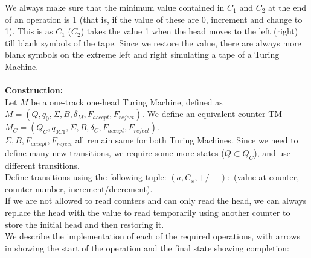 \documentclass[12pt,a4paper]{article}
\begin{document}
We always make sure that the minimum value contained in $C_1$ and $C_2$ at the end of an operation is 1 (that is, if the value of these are 0, increment and change to 1). This is as $C_1$ ($C_2$) takes the value 1 when the head moves to the left (right) till blank symbols of the tape. Since we restore the value, there are always more blank symbols on the extreme left and right simulating a tape of a Turing Machine.
\\
\\\textbf{Construction:}
\\Let $M$ be a one-track one-head Turing Machine, defined as $M = (Q,q_0,\Sigma,B,\delta_M,F_{accept},F_{reject})$. We define an equivalent counter TM $M_C = (Q_C,q_{0C1},\Sigma,B,\delta_C,F_{accept},F_{reject})$. 
\\$\Sigma,B,F_{accept},F_{reject}$ all remain same for both Turing Machines.
Since we need to define many new transitions, we require some more states ($ Q \subset Q_C $), and use different transitions.
\\Define transitions using the following tuple: $(a,C_x,+/-):$ (value at counter, counter number, increment/decrement).
\\If we are not allowed to read counters and can only read the head, we can always replace the head with the value to read temporarily using another counter to store the initial head and then restoring it.
\\We describe the implementation of each of the required operations, with arrows in showing the start of the operation and the final state showing completion:
\end{document}
